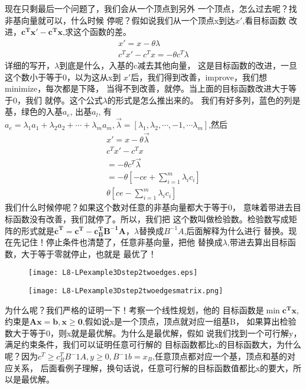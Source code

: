 {
	现在只剩最后一个问题了，我们会从一个顶点到另外
	一个顶点，怎么过去呢？找非基向量就可以，什么时候
	停呢？假如说我们从一个顶点x到达$x'$,看目标函数
	改进，$\mathbf{c^{T}x' - c^{T}x}$,求这个函数的差。
	\begin{eqnarray*}
		x' = x - \theta\lambda \\
		c^{T}x' - c^{T}x = -\theta c^{T}\lambda
	\end{eqnarray*}
	详细的写开，$\lambda$到底是什么，入基的c减去其他向量，
	这是目标函数的改进，一旦这个数小于等于0，以为这从x到
	$x'$后，我们得到改善，improve，我们想minimize，每次都是下降，
	当得不到改善，就停。当上面的目标函数改进大于等于0，我们
	就停。这个公式$\lambda$的形式是怎么推出来的。
	我们有好多列，蓝色的列是基，绿色的入基$a_{e}$, 出基$a_{l}$,
	有$a_{e} = \lambda_{1}a_{1} + \lambda_{2}a_{2} + \cdots
	+\lambda_{m}a_{m},\overrightarrow{\lambda} = [ \lambda_{1}, \lambda_{2},
	\cdots ,-1, \cdots \lambda_{m}]$,然后
	\begin{eqnarray*}
		x' = x - \theta\overrightarrow{\lambda} \\
		c^{T}x' - c^{T}x \\
		= -\theta c^{T}\overrightarrow{\lambda} \\
		= -\theta[ -ce + \sum_{i=1}^{m}\lambda_{i}c_{i}] \\
		\theta[ ce - \sum_{i=1}^{m}\lambda_{i}c_{i}]
	\end{eqnarray*}
	我们什么时候停呢？如果这个数对任意的非基向量都大于等于0，
	意味着带进去目标函数没有改善，我们就停了。所以，我们把
	这个数叫做检验数。检验数写成矩阵的形式就是$\mathbf{\overline{c}^T  = c^T - c_B^T B^{-1} A }$，$\lambda$替换成$B^{-1} A$,后面解释为什么进行
	替换。现在先记住！停止条件也清楚了，任意非基向量，把他
	替换成$\lambda$,带进去算出目标函数，大于等于零就停止，也就是
	最优了！
}
{
	  \begin{figure}[htb]%
	  	\begin{center}%
	  		\begin{minipage}{0.37\textwidth}%
	  			\texttt{[image: L8-LPexample3Dstep2twoedges.eps]}%
	  		\end{minipage}%
	  		\quad
	  		\begin{minipage}{0.42\textwidth}
	  			\texttt{[image: L8-LPexample3Dstep2twoedgesmatrix.png]}%
	  		\end{minipage}%
	  	\end{center}
	  \end{figure}
}
{
	为什么呢？我们严格的证明一下！考察一个线性规划，他的
	目标函数是$\min  \mathbf{c^Tx}$,约束是$\mathbf{Ax = b},
	\mathbf{x \geq 0 }$,假如说x是一个顶点，顶点就对应一组基B，
	如果算出检验数大于等于0，则x就是最优解。为什么是最优解，假如
	说我们找到一个可行解y，满足约束条件，我们可以证明任意可行解的
	目标函数都比x的目标函数大，为什么呢？因为$c^T \geq c^T_BB^-1A,
	y \geq 0, B^-1b = x_B$,任意顶点都对应一个基，顶点和基的对应关系，
	后面看例子理解，换句话说，任意可行解的目标函数值都比x的要大，所
	以是最优解。



}
